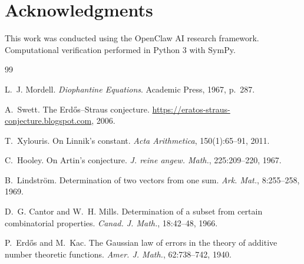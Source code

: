 \documentclass[11pt,a4paper]{article}
\theoremstyle{plain}
\theoremstyle{definition}
\begin{document}
\section*{Acknowledgments}

This work was conducted using the OpenClaw AI research framework. Computational verification performed in Python 3 with SymPy.

\begin{thebibliography}{99}

L.~J. Mordell.
\newblock \emph{Diophantine Equations}.
\newblock Academic Press, 1967, p.~287.

A.~Swett.
\newblock The Erd\H{o}s--Straus conjecture.
\newblock \url{https://eratos-straus-conjecture.blogspot.com}, 2006.

T.~Xylouris.
\newblock On Linnik's constant.
\newblock \emph{Acta Arithmetica}, 150(1):65--91, 2011.

C.~Hooley.
\newblock On Artin's conjecture.
\newblock \emph{J. reine angew. Math.}, 225:209--220, 1967.

B.~Lindstr\"om.
\newblock Determination of two vectors from one sum.
\newblock \emph{Ark. Mat.}, 8:255--258, 1969.

D.~G. Cantor and W.~H. Mills.
\newblock Determination of a subset from certain combinatorial properties.
\newblock \emph{Canad. J. Math.}, 18:42--48, 1966.

P.~Erd\H{o}s and M.~Kac.
\newblock The Gaussian law of errors in the theory of additive number theoretic functions.
\newblock \emph{Amer. J. Math.}, 62:738--742, 1940.

\end{thebibliography}
\end{document}
